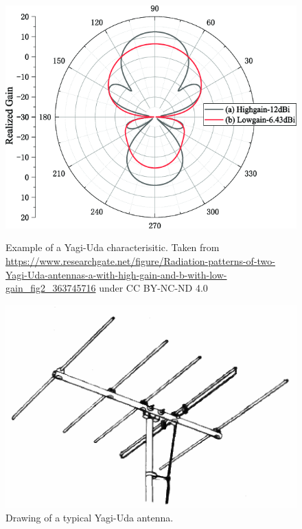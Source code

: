\documentclass[10pt, a4paper]{article}
\begin{document}
\begin{figure}[H]
  \begin{minipage}[t]{0.45\textwidth}
 \centering
  \includegraphics[width=\textwidth]{graphics/yagi.png}
  \caption{Example of a Yagi-Uda characterisitic. Taken from \url{https://www.researchgate.net/figure/Radiation-patterns-of-two-Yagi-Uda-antennas-a-with-high-gain-and-b-with-low-gain_fig2_363745716} under CC BY-NC-ND 4.0}

  \end{minipage}\hfill
  \begin{minipage}[t]{0.45\textwidth}
  \centering
  \includegraphics[width=\textwidth]{graphics/yagi2.png}
  \caption{Drawing of a typical Yagi-Uda antenna.}
  \end{minipage}
\end{figure}
\end{document}

